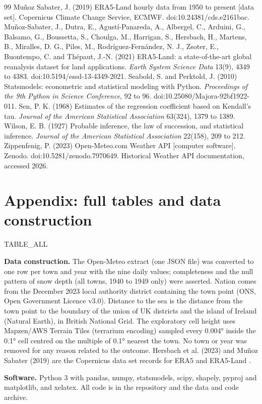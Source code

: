 \documentclass[11pt,a4paper]{article}
\begin{document}
\begin{thebibliography}{99}
 Muñoz Sabater, J. (2019) ERA5-Land hourly data from 1950 to present [data set]. Copernicus Climate Change Service, ECMWF. doi:10.24381/cds.e2161bac.
 Muñoz-Sabater, J., Dutra, E., Agustí-Panareda, A., Albergel, C., Arduini, G., Balsamo, G., Boussetta, S., Choulga, M., Harrigan, S., Hersbach, H., Martens, B., Miralles, D. G., Piles, M., Rodríguez-Fernández, N. J., Zsoter, E., Buontempo, C. and Thépaut, J.-N. (2021) ERA5-Land: a state-of-the-art global reanalysis dataset for land applications. \textit{Earth System Science Data} 13(9), 4349 to 4383. doi:10.5194/essd-13-4349-2021.
 Seabold, S. and Perktold, J. (2010) Statsmodels: econometric and statistical modeling with Python. \textit{Proceedings of the 9th Python in Science Conference}, 92 to 96. doi:10.25080/Majora-92bf1922-011.
 Sen, P. K. (1968) Estimates of the regression coefficient based on Kendall's tau. \textit{Journal of the American Statistical Association} 63(324), 1379 to 1389.
 Wilson, E. B. (1927) Probable inference, the law of succession, and statistical inference. \textit{Journal of the American Statistical Association} 22(158), 209 to 212.
 Zippenfenig, P. (2023) Open-Meteo.com Weather API [computer software]. Zenodo. doi:10.5281/zenodo.7970649. Historical Weather API documentation, accessed 2026.
\end{thebibliography}

\appendix
\section{Appendix: full tables and data construction}
{{TABLE_ALL}}

\textbf{Data construction.} The Open-Meteo extract (one JSON file) was converted to one row per town and year with the nine daily values; completeness and the null pattern of snow depth (all towns, 1940 to 1949 only) were asserted. Nation comes from the December 2023 local authority district containing the town point (ONS, Open Government Licence v3.0). Distance to the sea is the distance from the town point to the boundary of the union of UK districts and the island of Ireland (Natural Earth), in British National Grid. The exploratory cell height uses Mapzen/AWS Terrain Tiles (terrarium encoding) sampled every 0.004° inside the 0.1° cell centred on the multiple of 0.1° nearest the town. No town or year was removed for any reason related to the outcome. Hersbach et al. (2023) and Muñoz Sabater (2019) are the Copernicus data set records for ERA5 and ERA5-Land \citep{hersbach2023,munoz2019}.

\textbf{Software.} Python 3 with pandas, numpy, statsmodels, scipy, shapely, pyproj and matplotlib, and xelatex. All code is in the repository and the data and code archive.
\end{document}
